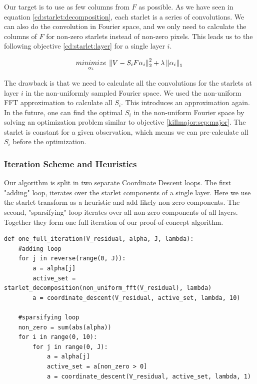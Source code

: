 Our target is to use as few columns from $F$ as possible. As we have seen in equation \eqref{cd:starlet:decomposition}, each starlet is a series of convolutions. We can also do the convolution in Fourier space, and we only need to calculate the columns of $F$ for non-zero starlets instead of non-zero pixels. This leads us to the following objective \eqref{cd:starlet:layer} for a single layer $i$.

\begin{equation}\label{cd:starlet:layer}
\underset{\alpha_i}{minimize} \: \left \| V - S_iF\alpha_i \right \|_2^2 + \lambda \left \| \alpha_i \right \|_1 \\
\end{equation}

The drawback is that we need to calculate all the convolutions for the starlets at layer $i$ in the non-uniformly sampled Fourier space. We used the non-uniform FFT approximation to calculate all $S_i$. This introduces an approximation again. In the future, one can find the optimal $S_i$ in the non-uniform Fourier space by solving an optimization problem similar to objective \eqref{killmajor:sep:major}. The starlet is constant for a given observation, which means we can pre-calculate all $S_i$ before the optimization. 


\subsubsection{Iteration Scheme and Heuristics}
Our algorithm is split in two separate Coordinate Descent loops. The first "adding" loop, iterates over the starlet components of a single layer. Here  we use the starlet transform as a heuristic and add likely non-zero components. The second, "sparsifying" loop iterates over all non-zero components of all layers. Together they form one full iteration of our proof-of-concept algorithm.
\begin{lstlisting} 
def one_full_iteration(V_residual, alpha, J, lambda):
	#adding loop
	for j in reverse(range(0, J)):
		a = alpha[j]
		active_set = starlet_decomposition(non_uniform_fft(V_residual), lambda)
		a = coordinate_descent(V_residual, active_set, lambda, 10)
		
	#sparsifying loop
	non_zero = sum(abs(alpha))
	for i in range(0, 10):
		for j in range(0, J):
			a = alpha[j]
			active_set = a[non_zero > 0]
			a = coordinate_descent(V_residual, active_set, lambda, 1)
\end{lstlisting}\label{cd:full}

